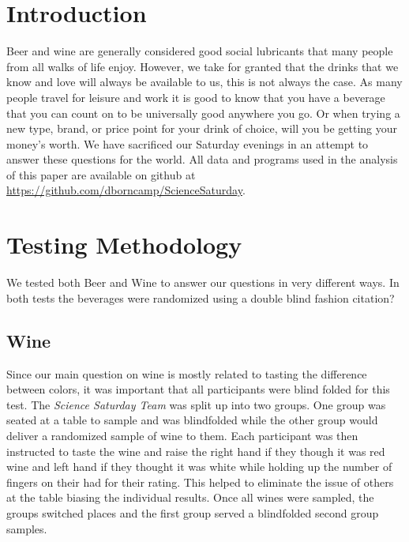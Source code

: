 \documentclass{aastex62}
\begin{document}
\section{Introduction} \label{sec:intro}
Beer and wine are generally considered good social lubricants that many people from all walks of life enjoy.
However, we take for granted that the drinks that we know and love will always be available to us, this is not always the case.
As many people travel for leisure and work it is good to know that you have a beverage that you can count on to be universally good anywhere you go.
Or when trying a new type, brand, or price point for your drink of choice, will you be getting your money's worth.
We have sacrificed our Saturday evenings in an attempt to answer these questions for the world.
All data and programs used in the analysis of this paper are available on github at \href{https://github.com/dborncamp/ScienceSaturday}{https://github.com/dborncamp/ScienceSaturday}.

\section{Testing Methodology} \label{sec:style}
We tested both Beer and Wine to answer our questions in very different ways.
In both tests the beverages were randomized using a double blind fashion citation? 

\subsection{Wine}
Since our main question on wine is mostly related to tasting the difference between colors, it was important that all participants were blind folded for this test.
The \textit{Science Saturday Team} was split up into two groups.
One group was seated at a table to sample and was blindfolded while the other group would deliver a randomized sample of wine to them.
Each participant was then instructed to taste the wine and raise the right hand if they though it was red wine and left hand if they thought it was white while holding up the number of fingers on their had for their rating.
This helped to eliminate the issue of others at the table biasing the individual results.
Once all wines were sampled, the groups switched places and the first group served a blindfolded second group samples.
\end{document}
